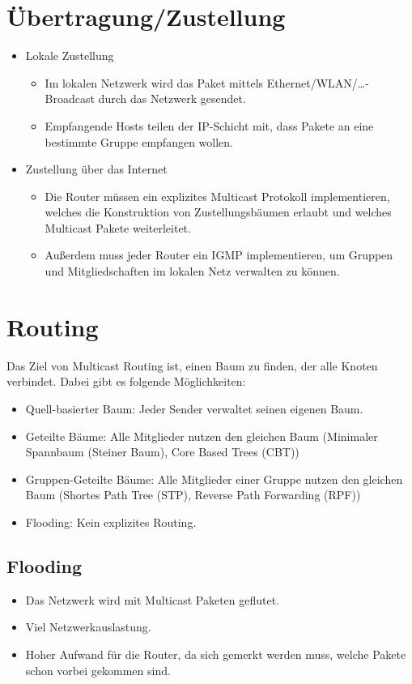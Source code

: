     \section{Übertragung/Zustellung}
        \begin{itemize}
        	\item Lokale Zustellung
	        	\begin{itemize}
	        		\item Im lokalen Netzwerk wird das Paket mittels Ethernet/WLAN/\dots-Broadcast durch das Netzwerk gesendet.
	        		\item Empfangende Hosts teilen der IP-Schicht mit, dass Pakete an eine bestimmte Gruppe empfangen wollen.
	        	\end{itemize}
        	\item Zustellung über das Internet
	        	\begin{itemize}
	        		\item Die Router müssen ein explizites Multicast Protokoll implementieren, welches die Konstruktion von Zustellungsbäumen erlaubt und welches Multicast Pakete weiterleitet.
	        		\item Außerdem muss jeder Router ein IGMP implementieren, um Gruppen und Mitgliedschaften im lokalen Netz verwalten zu können.
	        	\end{itemize}
        \end{itemize}

    \section{Routing}
        Das Ziel von Multicast Routing ist, einen Baum zu finden, der alle Knoten verbindet. Dabei gibt es folgende Möglichkeiten:
        \begin{itemize}
        	\item Quell-basierter Baum: Jeder Sender verwaltet seinen eigenen Baum.
        	\item Geteilte Bäume: Alle Mitglieder nutzen den gleichen Baum (Minimaler Spannbaum (Steiner Baum), Core Based Trees (CBT))
        	\item Gruppen-Geteilte Bäume: Alle Mitglieder einer Gruppe nutzen den gleichen Baum (Shortes Path Tree (STP), Reverse Path Forwarding (RPF))
        	\item Flooding: Kein explizites Routing.
        \end{itemize}

        \subsection{Flooding}
			\begin{itemize}
				\item Das Netzwerk wird mit Multicast Paketen geflutet.
				\item Viel Netzwerkauslastung.
				\item Hoher Aufwand für die Router, da sich gemerkt werden muss, welche Pakete schon vorbei gekommen sind.
			\end{itemize}

